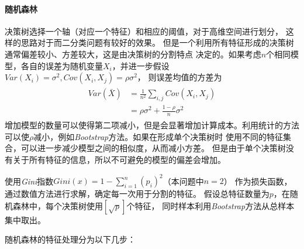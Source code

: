 \paragraph{随机森林}
决策树选择一个轴（对应一个特征）和相应的阈值，对于高维空间进行划分，
这样的思路对于而二分类问题有较好的效果。
但是一个利用所有特征形成的决策树通常偏差较小、方差较大，这是由决策树的分割特点
决定的。如果考虑$n$个相同模型，各自的误差为随机变量$X_i$，并进一步假设
$Var(X_i)=\sigma^2,Cov(X_i,X_j)=\rho\sigma^2$，
则误差均值的方差为
\begin{align*}
    \begin{split}
        Var(\bar{X})&=\frac{1}{n^2}\sum\limits_{i,j}Cov(X_i, X_j) \\
        & = \rho\sigma^2 + \frac{1-\rho}{n}\sigma^2
    \end{split}
\end{align*}
增加模型的数量可以使得第二项减小，但是会显著增加计算成本。利用统计的方法
可以使$\rho$减小，例如\textit{Bootstrap}方法。如果在形成单个决策树时
使用不同的特征集合，可以进一步减少模型之间的相似度，从而减小方差。
但是由于单个决策树没有关于所有特征的信息，所以不可避免的模型的偏差会增加。
\par 使用\textit{Gini}指数$Gini(x)=1-\sum_{i=1}^n (p_i)^2$（本问题中$n=2$）
作为损失函数，通过数值方法进行求解，确定每一次用于分割的特征。
假设总特征数量为$p$，在随机森林中，每个决策树使用$[\sqrt{p}]$个特征，
同时样本利用\textit{Bootstrap}方法从总样本集中取出。
\par 随机森林的特征处理分为以下几步：
